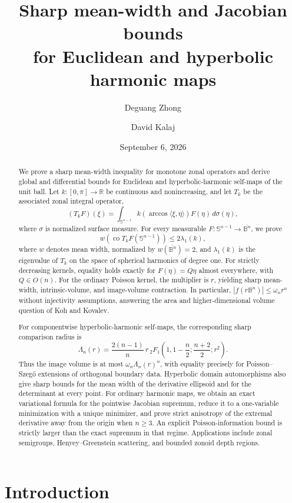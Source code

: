 \documentclass[11pt,reqno]{amsart}
\title[Mean-width and Jacobian bounds for harmonic maps]
{Sharp mean-width and Jacobian bounds\\
for Euclidean and hyperbolic harmonic maps}
\author{Deguang Zhong}
\author{David Kalaj}
\date{September 6, 2026}
\theoremstyle{remark}
\begin{document}
\begin{abstract}
We prove a sharp mean-width inequality for monotone zonal operators and
derive global and differential bounds for Euclidean and hyperbolic-harmonic
self-maps of the unit ball.  Let $k:[0,\pi]\to\mathbb R$ be continuous
and nonincreasing, and let $T_k$ be the associated zonal integral operator,
\[
 (T_kF)(\xi)=\int_{\mathbb S^{n-1}}
 k\!\left(\arccos\langle\xi,\eta\rangle\right)
 F(\eta)\,d\sigma(\eta),
\]
where $\sigma$ is normalized surface measure.  For every measurable
$F:\mathbb S^{n-1}\to\overline{\mathbb B^n}$, we prove
\[
 w\!\left(\operatorname{co}T_kF(\mathbb S^{n-1})\right)
 \le2\lambda_1(k),
\]
where $w$ denotes mean width, normalized by $w(\overline{\mathbb B^n})=2$,
and $\lambda_1(k)$ is the eigenvalue of $T_k$ on the space of spherical
harmonics of degree one.  For strictly decreasing kernels, equality
holds exactly for $F(\eta)=Q\eta$ almost everywhere, with $Q\in O(n)$.
For the ordinary Poisson kernel, the multiplier is $r$, yielding sharp
mean-width, intrinsic-volume, and image-volume contraction.  In particular,
$|f(r\mathbb B^n)|\le\omega_n r^n$ without injectivity assumptions,
answering the area and higher-dimensional volume question of Koh and Kovalev.

For componentwise hyperbolic-harmonic self-maps, the corresponding sharp
comparison radius is
\[
 \Lambda_n(r)=\frac{2(n-1)}n\,r\,
 {}_2F_1\!\left(1,1-\frac n2;\frac{n+2}2;r^2\right).
\]
Thus the image volume is at most $\omega_n\Lambda_n(r)^n$, with equality
precisely for Poisson--Szeg\H{o} extensions of orthogonal boundary data.
Hyperbolic domain automorphisms also give sharp bounds for the mean width
of the derivative ellipsoid and for the determinant at every point.  For ordinary harmonic maps, we obtain an exact
variational formula for the pointwise Jacobian supremum, reduce it to a
one-variable minimization with a unique minimizer, and prove strict
anisotropy of the extremal
derivative away from the origin when $n\ge3$.  An explicit
Poisson-information bound is strictly larger than the exact supremum
in that regime.
Applications include zonal semigroups, Henyey--Greenstein scattering,
and bounded zonoid depth regions.
\end{abstract}

\maketitle

\section{Introduction}
\end{document}
